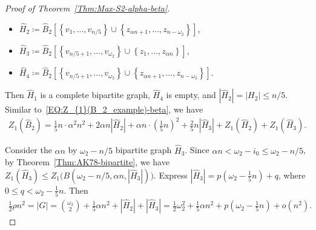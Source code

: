 \documentclass[11pt,a4paper]{article}
\begin{document}
\begin{proof}[Proof of Theorem~\ref{Thm:Max-S2-alpha-beta}]
\begin{itemize}
\item $\hat{H}_2\coloneqq \hat{B}_2\left[\left\{v_1,\ldots,v_{n/5}\right\}\cup\left\{z_{\alpha n+1}, \ldots, z_{n-\omega_2}\right\}\right]$, 

\item $\hat{H}_3\coloneqq \hat{B}_2\left[\left\{v_{n/5 +1}, \ldots, v_{\omega_2}\right\}\cup \left\{z_1, \ldots, z_{\alpha n}\right\}\right]$,  

\item $\hat{H}_4\coloneqq \hat{B}_2\left[\left\{v_{n/5 +1}, \ldots, v_{\omega_2}\right\}\cup \left\{z_{\alpha n+1}, \ldots, z_{n-\omega_2}\right\}\right]$.  
\end{itemize}
Then $\hat{H}_1$ is a complete bipartite graph, $\hat{H}_4$ is empty, and $|\hat{H}_2| = |H_2| \le n/5$. 
Similar to~\eqref{EQ:Z_{1}(B_2_example)-beta}, we have 
\begin{align}\label{EQ:Q-index-B2-H'-n/5}
Z_{1}(\hat{B}_2) = \frac{1}{5}n \cdot \alpha^2 n^2 + 2\alpha n |\hat{H}_2|+ \alpha n \cdot \left(\frac{1}{5}n\right)^2+ \frac{2}{5}n |\hat{H}_3|+Z_{1}(\hat{H}_2)+Z_{1}(\hat{H}_3). 
\end{align}

Consider the $\alpha n$ by $\omega_2 - n/5$ bipartite graph $\hat{H}_3$. 
Since $\alpha n < \omega_2 - i_0 \le \omega_2 - n/5$, by Theorem~\ref{Thm:AK78-bipartite}, we have $Z_{1}(\hat{H}_3) \le Z_{1}\big(B(\omega_2 - n/5, \alpha n, |\hat{H}_3|)\big)$. 
Express $|\hat{H}_3|= p \left(\omega_2 - \frac{1}{5}n\right)+q$, where $0 \le q < \omega_2 - \frac{1}{5}n$. 
Then 
\begin{align*}
\frac{1}{2} \rho n^2
= |G| 
= \binom{\omega_2}{2}+ \frac{1}{5} \alpha n^2 + |\hat{H}_2|+|\hat{H}_3|
= \frac{1}{2}\omega_2^2 + \frac{1}{5} \alpha n^2 + p \left(\omega_2 - \frac{1}{5}n\right) +o(n^2). 
\end{align*}


\end{proof}
\end{document}
